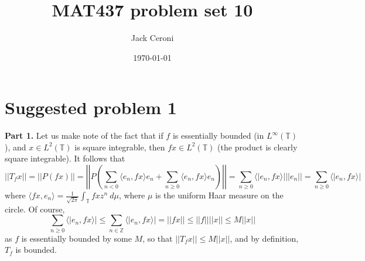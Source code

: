 \documentclass[aps,pra,showpacs,notitlepage,onecolumn,superscriptaddress,nofootinbib]{revtex4-1}
\theoremstyle{definition}
\begin{document}
\title{MAT437 problem set 10}
\author{Jack Ceroni}

\date{\today}

\maketitle

\section{Suggested problem 1}

\noindent \textbf{Part 1.} Let us make note of the fact that if $f$ is essentially bounded (in $L^{\infty}(\mathbb{T})$), and $x \in L^{2}(\mathbb{T})$ is square integrable, then $fx \in L^2(\mathbb{T})$ (the product
is clearly square integrable). It follows that
\begin{equation}
  ||T_f x|| = ||P(fx)|| = \left|\left|  P \left( \displaystyle\sum_{n < 0} \langle e_n, fx \rangle e_n + \displaystyle\sum_{n \geq 0} \langle e_n, fx \rangle e_n \right) \right| \right| =  \displaystyle\sum_{n \geq 0} \langle| e_n, fx \rangle| || e_n || = \displaystyle\sum_{n \geq 0} \langle| e_n, fx \rangle|
\end{equation}
where $\langle fx, e_n \rangle = \frac{1}{\sqrt{2\pi}} \int_{\mathbb{T}} fx z^n \ d\mu$, where $\mu$ is the uniform Haar measure on the circle. Of course,
\begin{equation}
  \displaystyle\sum_{n \geq 0} \langle| e_n, fx \rangle| \leq \displaystyle\sum_{n \in \mathbb{Z}} \langle| e_n, fx \rangle| = ||fx|| \leq ||f|| ||x|| \leq M ||x||
\end{equation}
as $f$ is essentially bounded by some $M$, so that $||T_f x|| \leq M ||x||$, and by definition, $T_f$ is bounded.
\newline
\end{document}
